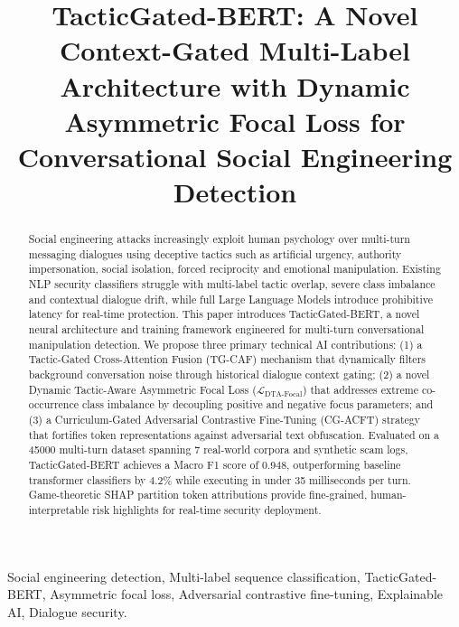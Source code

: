 \documentclass[10pt,conference]{IEEEtran}
\begin{document}
\title{TacticGated-BERT: A Novel Context-Gated Multi-Label Architecture with Dynamic Asymmetric Focal Loss for Conversational Social Engineering Detection}

\author{
}

\maketitle

\begin{abstract}
Social engineering attacks increasingly exploit human psychology over multi-turn messaging dialogues using deceptive tactics such as artificial urgency, authority impersonation, social isolation, forced reciprocity and emotional manipulation. Existing NLP security classifiers struggle with multi-label tactic overlap, severe class imbalance and contextual dialogue drift, while full Large Language Models introduce prohibitive latency for real-time protection. This paper introduces TacticGated-BERT, a novel neural architecture and training framework engineered for multi-turn conversational manipulation detection. We propose three primary technical AI contributions: (1) a Tactic-Gated Cross-Attention Fusion (TG-CAF) mechanism that dynamically filters background conversation noise through historical dialogue context gating; (2) a novel Dynamic Tactic-Aware Asymmetric Focal Loss ($\mathcal{L}_{\text{DTA-Focal}}$) that addresses extreme co-occurrence class imbalance by decoupling positive and negative focus parameters; and (3) a Curriculum-Gated Adversarial Contrastive Fine-Tuning (CG-ACFT) strategy that fortifies token representations against adversarial text obfuscation. Evaluated on a 45000 multi-turn dataset spanning 7 real-world corpora and synthetic scam logs, TacticGated-BERT achieves a Macro F1 score of 0.948, outperforming baseline transformer classifiers by 4.2\% while executing in under 35 milliseconds per turn. Game-theoretic SHAP partition token attributions provide fine-grained, human-interpretable risk highlights for real-time security deployment.
\end{abstract}

\begin{IEEEkeywords}
Social engineering detection, Multi-label sequence classification, TacticGated-BERT, Asymmetric focal loss, Adversarial contrastive fine-tuning, Explainable AI, Dialogue security.
\end{IEEEkeywords}
\end{document}
